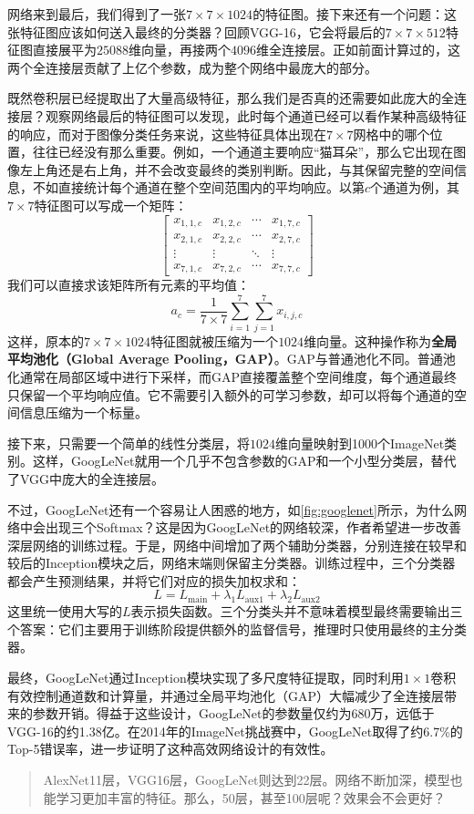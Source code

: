 网络来到最后，我们得到了一张$7\times7\times1024$的特征图。接下来还有一个问题：这张特征图应该如何送入最终的分类器？回顾VGG-16，它会将最后的$7\times7\times512$特征图直接展平为$25088$维向量，再接两个$4096$维全连接层。正如前面计算过的，这两个全连接层贡献了上亿个参数，成为整个网络中最庞大的部分。

既然卷积层已经提取出了大量高级特征，那么我们是否真的还需要如此庞大的全连接层？观察网络最后的特征图可以发现，此时每个通道已经可以看作某种高级特征的响应，而对于图像分类任务来说，这些特征具体出现在$7\times7$网格中的哪个位置，往往已经没有那么重要。例如，一个通道主要响应“猫耳朵”，那么它出现在图像左上角还是右上角，并不会改变最终的类别判断。因此，与其保留完整的空间信息，不如直接统计每个通道在整个空间范围内的平均响应。以第$c$个通道为例，其$7\times7$特征图可以写成一个矩阵：
$$
\begin{bmatrix}
x_{1,1,c} & x_{1,2,c} & \cdots & x_{1,7,c}\\
x_{2,1,c} & x_{2,2,c} & \cdots & x_{2,7,c}\\
\vdots & \vdots & \ddots & \vdots\\
x_{7,1,c} & x_{7,2,c} & \cdots & x_{7,7,c}
\end{bmatrix}
$$
我们可以直接求该矩阵所有元素的平均值：
$$
a_c=\frac{1}{7\times7}\sum_{i=1}^{7}\sum_{j=1}^{7}x_{i,j,c}
$$
这样，原本的$7\times7\times1024$特征图就被压缩为一个$1024$维向量。这种操作称为\textbf{全局平均池化（Global Average Pooling，GAP）}。GAP与普通池化不同。普通池化通常在局部区域中进行下采样，而GAP直接覆盖整个空间维度，每个通道最终只保留一个平均响应值。它不需要引入额外的可学习参数，却可以将每个通道的空间信息压缩为一个标量。

接下来，只需要一个简单的线性分类层，将$1024$维向量映射到1000个ImageNet类别。这样，GoogLeNet就用一个几乎不包含参数的GAP和一个小型分类层，替代了VGG中庞大的全连接层。

不过，GoogLeNet还有一个容易让人困惑的地方，如\cref{fig:googlenet}所示，为什么网络中会出现三个Softmax？这是因为GoogLeNet的网络较深，作者希望进一步改善深层网络的训练过程。于是，网络中间增加了两个辅助分类器，分别连接在较早和较后的Inception模块之后，网络末端则保留主分类器。训练过程中，三个分类器都会产生预测结果，并将它们对应的损失加权求和：
$$
L=L_{\mathrm{main}}+\lambda_1L_{\mathrm{aux1}}+\lambda_2L_{\mathrm{aux2}}
$$
这里统一使用大写的$L$表示损失函数。三个分类头并不意味着模型最终需要输出三个答案：它们主要用于训练阶段提供额外的监督信号，推理时只使用最终的主分类器。

最终，GoogLeNet通过Inception模块实现了多尺度特征提取，同时利用$1\times1$卷积有效控制通道数和计算量，并通过全局平均池化（GAP）大幅减少了全连接层带来的参数开销。得益于这些设计，GoogLeNet的参数量仅约为680万，远低于VGG-16的约1.38亿。在2014年的ImageNet挑战赛中，GoogLeNet取得了约6.7\%的Top-5错误率，进一步证明了这种高效网络设计的有效性。

\begin{quote}
    AlexNet11层，VGG16层，GoogLeNet则达到22层。网络不断加深，模型也能学习更加丰富的特征。那么，50层，甚至100层呢？效果会不会更好？
\end{quote}
